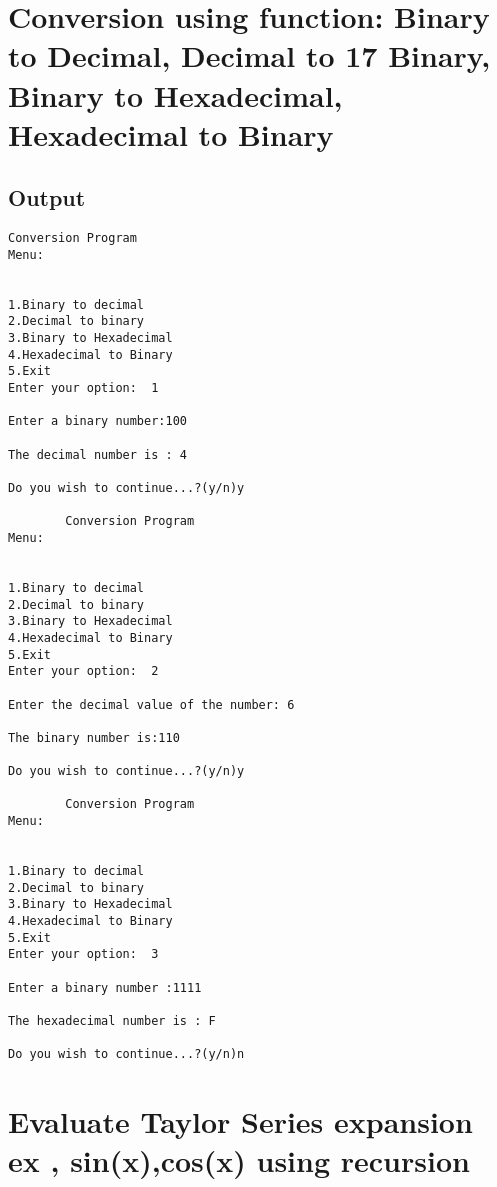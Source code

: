 \documentclass[pdftex,12pt,a4paper]{report}
\begin{document}
\section*{Conversion using function: Binary to Decimal, Decimal to
17 Binary, Binary to Hexadecimal, Hexadecimal to Binary}

\subsection*{Output}
\begin{lstlisting}
Conversion Program
Menu:


1.Binary to decimal
2.Decimal to binary
3.Binary to Hexadecimal
4.Hexadecimal to Binary
5.Exit
Enter your option:  1

Enter a binary number:100

The decimal number is : 4

Do you wish to continue...?(y/n)y

		Conversion Program
Menu:


1.Binary to decimal
2.Decimal to binary
3.Binary to Hexadecimal
4.Hexadecimal to Binary
5.Exit
Enter your option:  2

Enter the decimal value of the number: 6

The binary number is:110

Do you wish to continue...?(y/n)y

		Conversion Program
Menu:


1.Binary to decimal
2.Decimal to binary
3.Binary to Hexadecimal
4.Hexadecimal to Binary
5.Exit
Enter your option:  3

Enter a binary number :1111

The hexadecimal number is : F

Do you wish to continue...?(y/n)n

\end{lstlisting}



\newpage
\section*{Evaluate Taylor Series expansion ex , sin(x),cos(x) using recursion}

\end{document}
